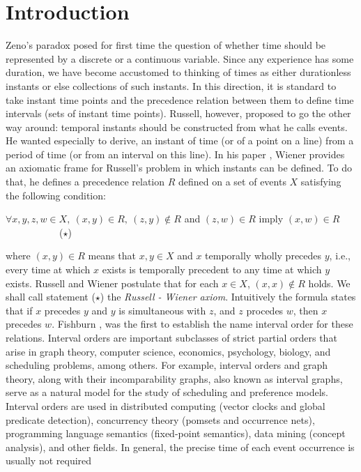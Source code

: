\documentclass{article}
\theoremstyle{definition}
\begin{document}
\section{Introduction} 
Zeno’s paradox posed for first time the question of whether time should be represented by a discrete or a continuous variable.
Since any experience has some duration, 
we have become accustomed to thinking of times as either durationless instants or else collections of such instants. In this direction, it is standard to take instant time points and the precedence relation between them to define time intervals (sets of instant time points).
Russell, however, proposed to go the other way around: temporal instants should be constructed from what he calls events.
He wanted especially to derive, an instant of time (or of a point on a line)
from a period of time (or from an interval on this line). 
In his paper \cite{wie}, Wiener provides an axiomatic frame for Russell's problem in which instants
can be defined.
To do that, he defines a precedence relation $R$ defined on a set of events $X$
satisfying the following condition:
\begin{center}
$\forall x, y, z, w\in X,\ (x,y)\in R,\ (z,y)\notin R$ and $(z,w)\in R$ imply $(x,w)\in R$\ \ \ \ \ \
\ \ \ \ \ ($\star$)
\end{center}
where $(x,y)\in R$ means that $x, y\in X$ and $x$ temporally wholly precedes $y$,
i.e., every time at which $x$ exists is temporally precedent to any time at which $y$ exists. 
Russell and Wiener postulate that for each $x\in X$, $(x,x)\notin R$ holds.
We shall call statement ($\star$) the {\it Russell - Wiener axiom}.
Intuitively the formula states that if $x$ precedes $y$ and $y$ is 
simultaneous with $z$, and $z$ procedes $w$, then $x$ precedes $w$.
Fishburn \cite{fis1}, \cite{fis2} was the first to establish the name interval order for these relations.
Interval orders are important subclasses of strict partial orders that arise in graph theory, computer science, economics, psychology, biology, and scheduling problems, among others.
For example, interval orders and graph theory, along with their incomparability graphs, also known as interval graphs, serve as a natural model for the study of scheduling and preference models.
Interval orders are used in distributed computing (vector clocks and global predicate detection), concurrency theory (pomsets and 
occurrence nets), programming language semantics (fixed-point semantics), data mining (concept analysis), and other fields.
In general, the precise time of each event occurrence is usually not required 
\end{document}
